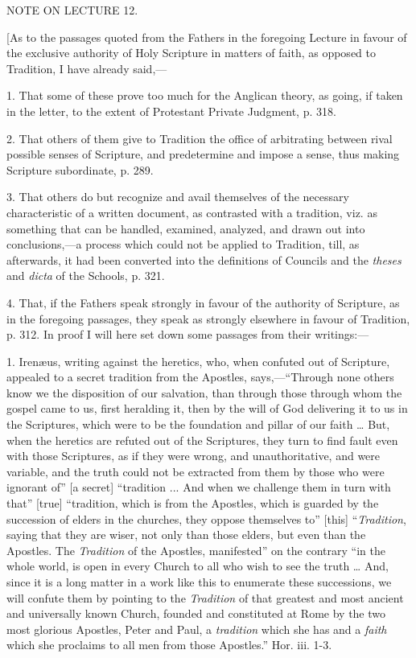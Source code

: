 NOTE
ON LECTURE
12.

[As to the passages quoted from the Fathers in the foregoing
Lecture in favour of the exclusive authority of Holy Scripture in
matters of faith, as opposed to Tradition, I have already said,—

1. That some of these prove too much for the Anglican theory, as
going, if taken in the letter, to the extent of Protestant Private
Judgment, p. 318.

2. That others of them give to Tradition the office of arbitrating
between rival possible senses of Scripture, and predetermine and
impose a sense, thus making Scripture subordinate, p. 289.

3. That others do but recognize and avail themselves of the
necessary characteristic of a written document, as contrasted with a
tradition, viz. as something that can be handled, examined, analyzed,
and drawn out into conclusions,—a process which could not be applied
to Tradition, till, as afterwards, it had been converted into the
definitions of Councils and the \emph{theses} and \emph{dicta} of the
Schools, p. 321.

4. That, if the Fathers speak strongly in favour of the authority
of Scripture, as in the foregoing passages, they speak as strongly
elsewhere in favour of Tradition, p. 312. In proof I will here set
down some passages from their writings:—

1. Irenæus, writing against the heretics, who, when confuted out
of Scripture, appealed to a secret tradition from the Apostles, says,—``Through
none others know we the disposition of our salvation, than through
those through whom the gospel came to us, first heralding it, then by
the will of God delivering it to us in the Scriptures, which were to
be the foundation and pillar of our faith … But, when the heretics
are refuted out of the Scriptures, they turn to find fault even with
those Scriptures, as if they were wrong, and unauthoritative, and were
variable, and the truth could not be extracted from them by those who
were ignorant of'' [a secret] ``tradition ... And when we
challenge them in turn with that'' [true] ``tradition, which
is from the Apostles, which is guarded by the succession of elders in
the churches, they oppose themselves to'' [this] ``\emph{Tradition},
saying that they are wiser, not only than those elders, but even than
the Apostles. The \emph{Tradition} of the Apostles, manifested''
on the contrary ``in the whole world, is open in every Church to
all who wish to see the truth … And, since it is a long matter in a
work like this to enumerate these successions, we will confute
them by pointing to the \emph{Tradition} of that greatest and most
ancient and universally known Church, founded and constituted at Rome
by the two most glorious Apostles, Peter and Paul, a \emph{tradition}
which she has and a \emph{faith} which she proclaims to all men from
those Apostles.'' Hor. iii. 1-3.

